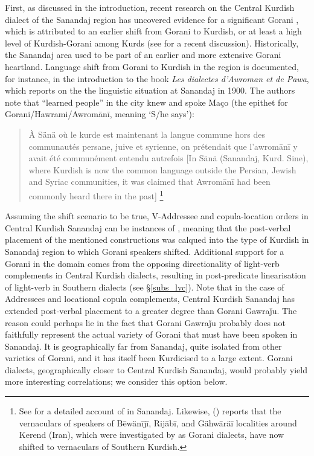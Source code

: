 \documentclass[output=paper,colorlinks,citecolor=brown]{langscibook}
\begin{document}
\begin{sloppypar}
First, as discussed in the introduction, recent research on the Central Kurdish dialect of the Sanandaj region has uncovered evidence for a significant Gorani , which is attributed to an earlier shift from Gorani to Kurdish, or at least a high level of Kurdish-Gorani  among Kurds (see \citealt[]{mohammadirad_gorani_inpress}{} for a recent discussion). Historically, the Sanandaj area used to be part of an earlier and more extensive Gorani heartland. Language shift from Gorani to Kurdish in the region is documented, for instance, in the introduction to the book \textit{Les dialectes d'Awroman et de Pawa}, which reports on the the linguistic situation at Sanandaj in 1900. The authors note that “learned people” in the city knew and spoke Maço (the epithet for Gorani/Hawrami/Awromānī, meaning `S/he says'):

\begin{quote}
    À Sänä où le kurde est maintenant la langue commune hors des communautés persane, juive et syrienne, on prétendait que l'awromānī y avait été communément entendu autrefois [In Sänä (Sanandaj, Kurd. Sine), where Kurdish is now the common language outside the Persian, Jewish and Syriac communities, it was claimed that Awromānī had been commonly heard there in the past] \citep[][5]{Christensen1921}{}{}\footnote{See \citet{khan_language_2023} for a detailed account of  in Sanandaj. Likewise, (\citealt[3]{Mahmoudveysi2016}{}) reports that the vernaculars of speakers of Bēwänījī, Rijābī, and Gähwāräī localities around Kerend (Iran), which were investigated by \citet{mann_mundarten_1930} as Gorani dialects, have now shifted to vernaculars of Southern Kurdish.}
\end{quote}

Assuming the shift scenario to be true, V-Addressee and copula-location orders in Central Kurdish Sanandaj can be instances of  \citep[or ``'' in terms of ][]{ross_syntax_2019}{}{}, meaning that the post-verbal placement of the mentioned constructions was calqued into the type of Kurdish in Sanandaj region to which Gorani speakers shifted. Additional support for a Gorani  in the  domain comes from the opposing directionality of light-verb complements in Central Kurdish dialects, resulting in post-predicate linearisation of light-verb  in Southern dialects (see §\ref{subs_lvc}). Note that in the case of Addressees and locational copula complements, Central Kurdish Sanandaj has extended post-verbal placement to a greater degree than Gorani Gawraǰu. The reason could perhaps lie in the fact that Gorani Gawraǰu probably does not faithfully represent the actual  variety of Gorani that must have been spoken in Sanandaj. It is geographically far from Sanandaj, quite isolated from other varieties of Gorani, and it has itself been Kurdicised to a large extent. Gorani dialects, geographically closer to Central Kurdish Sanandaj, would probably yield more interesting correlations; we consider this option below. 


\end{sloppypar}
\end{document}
